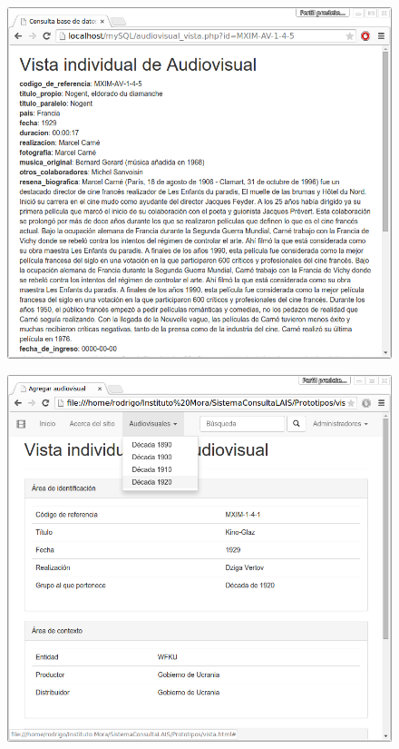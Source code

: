 \documentclass{beamer}
\begin{document}
\begin{frame}
	\begin{figure}[H]
		\centering
		\includegraphics[keepaspectratio=true,width=\linewidth]{Prototipo_04.png}
		\label{fig:vista_audiovisual}
	\end{figure}	
\end{frame}


\begin{frame}
	\begin{figure}[H]
		\centering
		\includegraphics[keepaspectratio=true,width=\linewidth]{Prototipo_06.png}
		\label{fig:disenio_principal}
	\end{figure}	
\end{frame}
\end{document}

